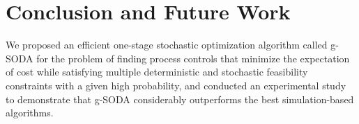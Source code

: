 \documentclass[a4paper, 12pt]{article} %
\begin{document}

\section{Conclusion and Future Work}
\label{sec:conclusion}

We proposed an efficient one-stage stochastic optimization algorithm called g-SODA for the problem of finding process controls that minimize the expectation of cost while satisfying multiple deterministic and stochastic feasibility constraints with a given high probability, and conducted an experimental study to demonstrate that g-SODA considerably outperforms the best simulation-based algorithms.
\end{document}
